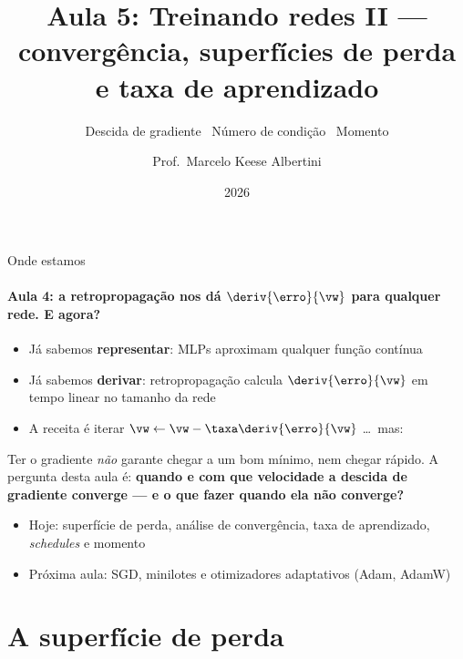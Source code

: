 \documentclass[aspectratio=169, 11pt]{beamer}
\title[Aula 5 — Convergência e taxa de aprendizado]%
      {Aula 5: Treinando redes II —\\ convergência, superfícies de perda e taxa de aprendizado}
\subtitle[GBC073 — Inteligência Computacional]%
         {Descida de gradiente \textbullet\ Número de condição \textbullet\ Momento}
\author[Prof.\ Marcelo Albertini]{Prof.\ Marcelo Keese Albertini}
\institute{GBC073 — Inteligência Computacional \textbullet\ Universidade Federal de Uberlândia}
\date{2026}
\begin{document}
\begin{frame}
  \titlepage
\end{frame}

\begin{frame}{Onde estamos}
  \framesubtitle{Aula 4: a retropropagação nos dá $\deriv{\erro}{\vw}$ para qualquer rede. E agora?}

  \begin{itemize}\setlength{\itemsep}{0.4ex}
    \item Já sabemos \textbf{representar}: MLPs aproximam qualquer função contínua
    \item Já sabemos \textbf{derivar}: retropropagação calcula \(\deriv{\erro}{\vw}\)
          em tempo linear no tamanho da rede
    \item A receita é iterar
          \(\vw \leftarrow \vw - \taxa \deriv{\erro}{\vw}\) \dots\ mas:
  \end{itemize}

  \begin{ideiabox}
    Ter o gradiente \emph{não} garante chegar a um bom mínimo, nem chegar rápido.
    A pergunta desta aula é: \textbf{quando e com que velocidade a descida de
    gradiente converge — e o que fazer quando ela não converge?}
  \end{ideiabox}

  \begin{itemize}\setlength{\itemsep}{0.2ex}
    \item Hoje: superfície de perda, análise de convergência, taxa de aprendizado,
          \emph{schedules} e momento
    \item Próxima aula: SGD, minilotes e otimizadores adaptativos (Adam, AdamW)
  \end{itemize}
\end{frame}

\section{A superfície de perda}
\end{document}
